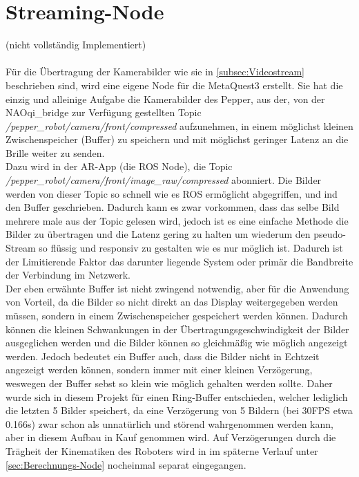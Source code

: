 \section{Streaming-Node}\label{sec:Streaming-Node}
(nicht vollständig Implementiert)\\\\
Für die Übertragung der Kamerabilder wie sie in \autoref{subsec:Videostream} beschrieben sind, wird eine eigene Node für die MetaQuest3 erstellt. Sie hat die einzig und alleinige Aufgabe die Kamerabilder des Pepper, aus der, von der NAOqi\_bridge zur Verfügung gestellten Topic \textit{/pepper\_robot/camera/front/compressed} aufzunehmen, in einem möglichst kleinen Zwischenspeicher (Buffer) zu speichern und mit möglichst geringer Latenz an die Brille weiter zu senden.\\
Dazu wird in der \ac{AR}-App (die \ac{ROS} Node), die Topic \textit{/pepper\_robot/camera/front/image\_raw/compressed} abonniert. Die Bilder werden von dieser Topic so schnell wie es \ac{ROS} ermöglicht abgegriffen, und ind den Buffer geschrieben. Dadurch kann es zwar vorkommen, dass das selbe Bild mehrere male aus der Topic gelesen wird, jedoch ist es eine einfache Methode die Bilder zu übertragen und die Latenz gering zu halten um wiederum den pseudo-Stream so flüssig und responsiv zu gestalten wie es nur möglich ist. Dadurch ist der Limitierende Faktor das darunter liegende System oder primär die Bandbreite der Verbindung im Netzwerk.\\
Der eben erwähnte Buffer ist nicht zwingend notwendig, aber für die Anwendung von Vorteil, da die Bilder so nicht direkt an das Display weitergegeben werden müssen, sondern in einem Zwischenspeicher gespeichert werden können. Dadurch können die kleinen Schwankungen in der Übertragungsgeschwindigkeit der Bilder ausgeglichen werden und die Bilder können so gleichmäßig wie möglich angezeigt werden. Jedoch bedeutet ein Buffer auch, dass die Bilder nicht in Echtzeit angezeigt werden können, sondern immer mit einer kleinen Verzögerung, weswegen der Buffer sebst so klein wie möglich gehalten werden sollte. Daher wurde sich in diesem Projekt für einen Ring-Buffer entschieden, welcher lediglich die letzten 5 Bilder speichert, da eine Verzögerung von 5 Bildern (bei 30\ac{FPS} etwa 0.166s) zwar schon als unnatürlich und störend wahrgenommen werden kann, aber in diesem Aufbau in Kauf genommen wird. Auf Verzögerungen durch die Trägheit der Kinematiken des Roboters wird in im späterne Verlauf unter \autoref{sec:Berechnungs-Node} nocheinmal separat eingegangen.\\

